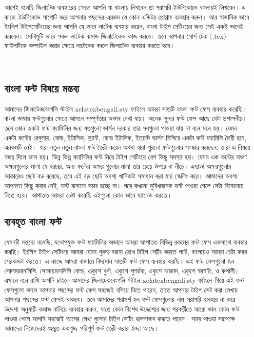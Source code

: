 আগেই বলেছি জিলাটেক ব্যবহারের ক্ষেত্রে আপনি যা বাংলায় লিখবেন তা সরাসরি ইউনিকোডে বাংলায়ই লিখবেন। এ কাজে ইউনিকোড সাপোর্ট করে আপনার পছন্দের এরকম যে কোন এডিটর প্রোগ্রাম ব্যবহার করুন। আর স্বাভাবিক ভাবে ইংলিশ টাইপসেটিংয়ের জন্য আপনি যে ভাবে লাটেক ব্যবহার করেন, বাংলা টাইপ সেটিংয়ের জন্য সেই একই ভাবেই করবেন। মোটামুটি ভাবে সকল লাটেক কমান্ড জিলাটেকেও কাজ করবে। তবে আপনার সোর্স টেক (.tex) ফাইলটিকে কম্পাইল করার ক্ষেত্রে লাটেকের বদলে জিলাটেক ব্যবহার করতে হবে।  

‌\subsection{বাংলা ফন্ট বিষয়ে মন্তব্য}
আমাদের জিলাটেকবেংগলি স্টাইল xelatexbengali.sty ফাইলে আমরা সাতটি বাংলা ফন্ট ফেস ব্যবহার করেছি। বাংলা ভাষায় ফন্টগুলোর ক্ষেত্রে আসলে সম্পূর্ণতার অভাব দেখা যায়। অনেক সুন্দর ফন্ট ফেস আছে যেটা প্রশংসনীয়। তবে কোন একটা ফন্ট ফ্যামিলির জন্য যতগুলো ভার্সন দরকার তার সবগুলো পাওয়া যায় না বলে মনে হয়। যেমন একটা ফন্টের রেগুলার, বোল্ড, ইটালিক, স্ল্যান্ট, বোল্ড ইটালিক, ইত্যাদি ভার্সন মিলিয়ে একটা ফন্ট ফ্যামিলি তৈরী হবে, এরকমটি নেই। যারা নতুন নতুন বাংলা ফন্ট তৈরী করেন অথবা যারা পুরনো ফন্টগুলোর সংস্কার করছেন, তারা এ বিষয়ে নজর দিলে ভাল হয়। ভিন্ন ভিন্ন ফ্যামিলির ফন্ট নিয়ে টাইপ সেটিংয়ে বেশ কিছু সমস্যা হয়। যেমন এক ফন্টের বাংলা অক্ষরগুলোর মাত্রা যে বরারর, অন্য ফন্টের অক্ষর গুলোর মাত্রা তার চেয়ে উপরে বা নীচে। এছাড়া অক্ষরগুলোর আকারেও ছোট বড় রয়েছে, তবে এই বড় ছোট অবশ্য খানিকটা সমাধান করা যায় স্কেলিং করে। আমাদের অবশ্য আপাতত কিছু করার নেই, ফন্ট বানানো সম্ভব হচ্ছে না। পরে কখনো সুবিধাজনক ফন্ট পাওয়া গেলে সেটা বিবেচনায় নিতে হবে। আপাতত আমরা চেষ্টা করেছি এইগুলো কোন ভাবে ম্যানেজ করতে।

\subsection{ব্যবহৃত বাংলা ফন্ট}
যেমনটি মন্তব্যে বলেছি, যথোপযুক্ত ফন্ট ফ্যামিলির অভাবে আমরা আপাতত বিভিন্ন রকমের ফন্ট ফেস একসাথে ব্যবহার করছি। ইংলিশ টাইপ সেটিংয়ে আমরা যেমন গুরুত্ব বজায় রেখে টাইপ সেটিং করতে পারি, বাংলায়ও আমরা চেষ্টা করব সেরকমটা করতে। এ কাজে আমরা বাজারে বিদ্যমান সাতটি ফন্ট ফেস ব্যবহার করছি। এই ফন্ট ফেসগুলো হল সোলায়মানলিপি, সোলায়মানলিপি বোল্ড, একুশে দুর্গা, একুশে পুণর্ভবা, একুশে আজাদ, একুশে স্বরস্বতি, ও রুপালী। এখানে বলে রাখি আপনি চাইলে আমাদের জিলাটেকবেংগলি স্টাইল xelatexbengali.sty ফাইলে গিয়ে এই ফন্ট  ফেসগুলো বদলে আপনার পছন্দের ফন্ট ফেস সহজেই বসিয়ে দিতে পারেন, তাতে আপনার টাইপ সেট করা লেখায় আপনার পছন্দের ফন্ট  ফেসই থাকবে। তবে আমাদের পরামর্শ হল ফন্ট  ফেসগুলোর নাম সরাসরি ব্যবহার না করে উদ্দেশ্য অনুযায়ী কমান্ড বানিয়ে ব্যবহার করুন, যাতে কোন বিশেষ উদ্দেশ্যের জন্য পরবর্তীতে আরো ভাল কোন ফন্ট পাওয়া গেলে আপনি সহজেই আগের লেখা গুলোর টাইপ সেটিং হালনাগাদ করতে পারেন।  সময় পাওয়া সাপেক্ষে আমাদের নিজেদেরই অন্তুত একগুচ্ছ পরিপূর্ণ ফন্ট তৈরী করার ইচ্ছা আছে। 

